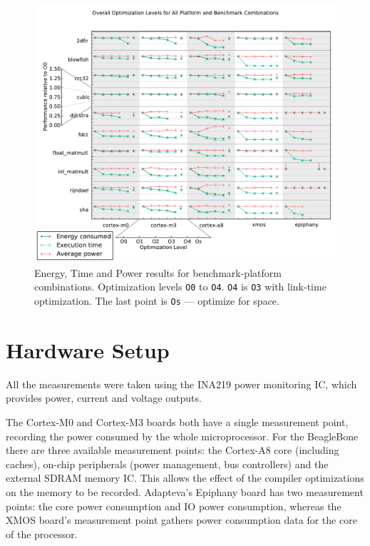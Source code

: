 \documentclass[twocolumn]{article}
\let\oldcaption\caption
\renewcommand{\caption}[1]{\oldcaption{\textup{#1}}}
\begin{document}
\begin{figure}[tb!]
	\centering
	\includegraphics[width=\textwidth,clip, trim=0cm 0cm 0 2.1cm]{levels.pdf}
	\caption{Energy, Time and Power results for benchmark-platform combinations. Optimization levels \texttt{O0} to \texttt{O4}. \texttt{O4} is \texttt{O3} with link-time optimization. The last point is \texttt{Os} --- optimize for space. }
	\label{Fig:OverallView}
\end{figure}

\section{Hardware Setup}

All the measurements were taken using the INA219 power monitoring IC\cite{INA219}, which provides power, current and voltage outputs.

The Cortex-M0 and Cortex-M3 boards both have a single measurement point, recording the power consumed by the whole microprocessor. For the BeagleBone there are three available measurement points: the Cortex-A8 core (including caches), on-chip peripherals (power management, bus controllers) and the external SDRAM memory IC. This allows the effect of the compiler optimizations on the memory to be recorded. Adapteva's Epiphany board has two measurement points: the core power consumption and IO power consumption, whereas the XMOS board's measurement point gathers power consumption data for the core of the processor.
\end{document}
